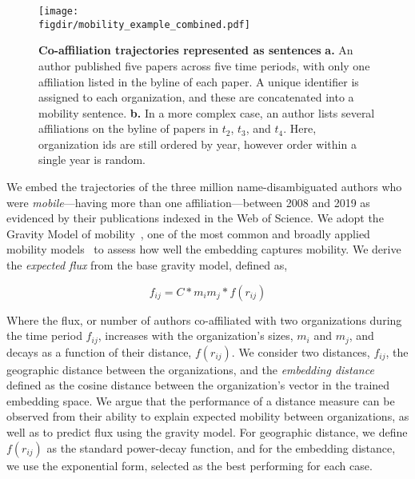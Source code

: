 \documentclass[12pt]{article} %
\def\figdir{../Figs}
\begin{document}
%
%
\begin{figure}[ht!]
    \centering
    \texttt{[image: \\figdir/mobility\_example\_combined.pdf]}
    \caption{
        \textbf{Co-affiliation trajectories represented as sentences}
        \textbf{a.} 
        An author published five papers across five time periods, with only one affiliation listed in the byline of each paper. 
        A unique identifier is assigned to each organization, and these are concatenated into a mobility sentence. 
        \textbf{b.}
        In a more complex case, an author lists several affiliations on the byline of papers in $t_{2}$, $t_{3}$, and $t_{4}$. Here, organization ids are still ordered by year, however order within a single year is random.      
    }
    \label{fig:methods:mobility_sentence}
\end{figure}


We embed the trajectories of the three million name-disambiguated authors who were \textit{mobile}---having more than one affiliation---between 2008 and 2019 as evidenced by their publications indexed in the Web of Science. 
We adopt the Gravity Model of mobility~\autocite{zipf1946gravity}, one of the most common and broadly applied mobility models~\autocite{curiel2018citygravity, lewer2008immigrationgravity, jung2008highwaygravity, hong2016busgravity, truscott2012epidemicgravity, xia2005measlesgravity} to assess how well the embedding captures mobility. 
We derive the \textit{expected flux} from the base gravity model, defined as,

\begin{equation}
	\label{eq:gravity_basic}
	f_{ij} = C*m_{i}m_{j}*f(r_{ij})
\end{equation}

Where the flux, or number of authors co-affiliated with two organizations during the time period $f_{ij}$, increases with the organization's sizes, $m_{i}$ and $m_{j}$, and decays as a function of their distance, $f(r_{ij})$. 
We consider two distances, $f_{ij}$, the geographic distance between the organizations, and the \textit{embedding distance} defined as the cosine distance between the organization's vector in the trained embedding space. 
We argue that the performance of a distance measure can be observed from their ability to explain expected mobility between organizations, as well as to predict flux using the gravity model. 
For geographic distance, we define $f(r_{ij})$ as the standard power-decay function, and for the embedding distance, we use the exponential form, selected as the best performing for each case. 
\end{document}
